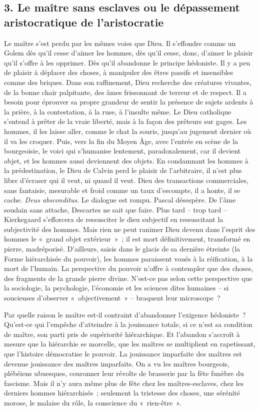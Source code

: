 \documentclass[french,twoside]{book} %
\begin{document}
\subsection[{3. Le maître sans esclaves ou le dépassement aristocratique de l’aristocratie}]{\textsc{3.} Le maître sans esclaves ou le dépassement aristocratique de l’aristocratie}
\noindent Le maître s’est perdu par les mêmes voies que Dieu. Il s’effondre comme un Golem dès qu’il cesse d’aimer les hommes, dès qu’il cesse, donc, d’aimer le plaisir qu’il s’offre à les opprimer. Dès qu’il abandonne le principe hédoniste. Il y a peu de plaisir à déplacer des choses, à manipuler des êtres passifs et insensibles comme des briques. Dans son raffinement, Dieu recherche des créatures vivantes, de la bonne chair palpitante, des âmes frissonnant de terreur et de respect. Il a besoin pour éprouver sa propre grandeur de sentir la présence de sujets ardents à la prière, à la contestation, à la ruse, à l’insulte même. Le Dieu catholique s’entend à prêter de la vraie liberté, mais à la façon des prêteurs sur gages. Les hommes, il les laisse aller, comme le chat la souris, jusqu’au jugement dernier où il va les croquer. Puis, vers la fin du Moyen Âge, avec l’entrée en scène de la bourgeoisie, le voici qui s’humanise lentement, paradoxalement, car il devient objet, et les hommes aussi deviennent des objets. En condamnant les hommes à la prédestination, le Dieu de Calvin perd le plaisir de l’arbitraire, il n’est plus libre d’écraser qui il veut, ni quand il veut. Dieu des transactions commerciales, sans fantaisie, mesurable et froid comme un taux d’escompte, il a honte, il se cache. \emph{Deus absconditus}. Le dialogue est rompu. Pascal désespère. De l’âme soudain sans attache, Descartes ne sait que faire. Plus tard – trop tard – Kierkegaard s’efforcera de ressusciter le dieu subjectif en ressuscitant la subjectivité des hommes. Mais rien ne peut ranimer Dieu devenu dans l’esprit des hommes le « grand objet extérieur » ; il est mort définitivement, transformé en pierre, madréporisé. D’ailleurs, saisis dans le glacis de sa dernière étreinte (la Forme hiérarchisée du pouvoir), les hommes paraissent voués à la réification, à la mort de l’humain. La perspective du pouvoir n’offre à contempler que des choses, des fragments de la grande pierre divine. N’est-ce pas selon cette perspective que la sociologie, la psychologie, l’économie et les sciences dites humaines – si soucieuses d’observer « objectivement » – braquent leur microscope ?\par
Par quelle raison le maître est-il contraint d’abandonner l’exigence hédoniste ? Qu’est-ce qui l’empêche d’atteindre à la jouissance totale, si ce n’est sa condition de maître, son parti pris de supériorité hiérarchique. Et l’abandon s’accroît à mesure que la hiérarchie se morcelle, que les maîtres se multiplient en rapetissant, que l’histoire démocratise le pouvoir. La jouissance imparfaite des maîtres est devenue jouissance des maîtres imparfaits. On a vu les maîtres bourgeois, plébéiens ubuesques, couronner leur révolte de brasserie par la fête funèbre du fascisme. Mais il n’y aura même plus de fête chez les maîtres-esclaves, chez les derniers hommes hiérarchisés ; seulement la tristesse des choses, une sérénité morose, le malaise du rôle, la conscience du « rien-être ».\par
\end{document}
